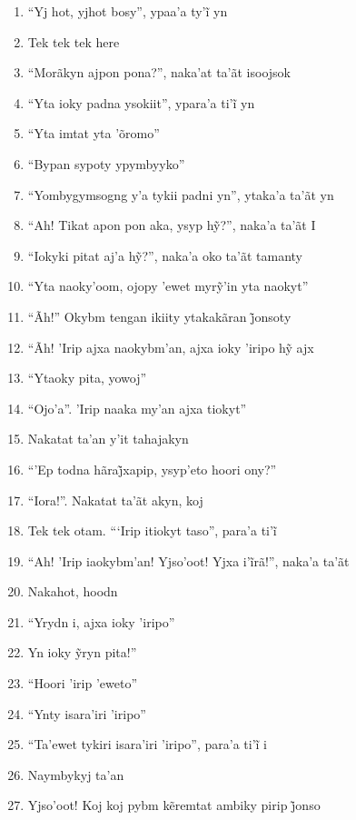 \begin{enumerate}
 \item ``Yj hot, yjhot bosy'', ypaa’a ty’ĩ yn
 \begin{center}\end{center}
 \item Tek tek tek here
 \item ``Morãkyn ajpon pona?'', naka'at ta'ãt isoojsok
 \item ``Yta ioky padna ysokiit'', ypara’a ti’ĩ yn
 \item ``Yta imtat yta 'õromo''
 \item ``Bypan sypoty ypymbyyko''
 \item ``Yombygymsogng y'a tykii padni yn'', ytaka'a ta'ãt yn
 \item ``Ah! Tikat apon pon aka, ysyp hỹ?'', naka’a ta’ãt I
 \item ``Iokyki pitat aj’a hỹ?'', naka’a oko ta’ãt tamanty
 \item ``Yta naoky’oom, ojopy ’ewet myrỹ’in yta naokyt''
 \begin{center}\end{center}
 \item ``Ãh!'' Okybm tengan ikiity ytakakãran j̃onsoty
 \item ``Ãh! ’Irip ajxa naokybm’an, ajxa ioky ’iripo hỹ ajx
 \item ``Ytaoky pita, yowoj''
 \item ``Ojo'a''. 'Irip naaka my'an ajxa tiokyt''
 \item Nakatat ta'an y'it tahajakyn
 \item ``’Ep todna hãraj̃xapip, ysyp’eto hoori ony?''
 \item ``Iora!''. Nakatat ta'ãt akyn, koj
 \item Tek tek otam. ``‘Irip itiokyt taso'', para’a ti’ĩ
 \item ``Ah! ’Irip iaokybm’an! Yjso’oot! Yjxa i’ĩrã!'', naka’a ta’ãt
 \item Nakahot, hoodn
 \item ``Yrydn i, ajxa ioky 'iripo''
 \item Yn ioky ỹryn pita!''
 \item ``Hoori 'irip 'eweto''
 \item ``Ynty isara'iri 'iripo''
 \item ``Ta’ewet tykiri isara’iri ’iripo'', para’a ti’ĩ i
 \begin{center}\end{center}
 \item Naymbykyj ta'an
 \item Yjso’oot! Koj koj pybm kẽremtat ambiky pirip j̃onso

\end{enumerate}
